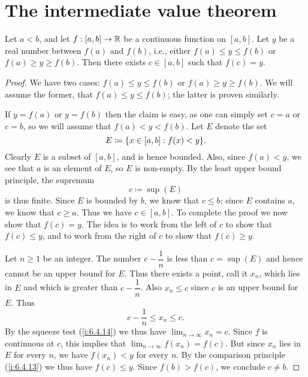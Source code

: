 \section{The intermediate value theorem}\label{i:sec:9.7}

\begin{thm}\label{i:9.7.1}
  Let \(a < b\), and let \(f : [a, b] \to \mathbb{R}\) be a continuous function on \([a, b]\).
  Let \(y\) be a real number between \(f(a)\) and \(f(b)\), i.e., either \(f(a) \leq y \leq f(b)\) or \(f(a) \geq y \geq f(b)\).
  Then there exists \(c \in [a, b]\) such that \(f(c) = y\).
\end{thm}

\begin{proof}
  We have two cases: \(f(a) \leq y \leq f(b)\) or \(f(a) \geq y \geq f(b)\).
  We will assume the former, that \(f(a) \leq y \leq f(b)\);
  the latter is proven similarly.

  If \(y = f(a)\) or \(y = f(b)\) then the claim is easy, as one can simply set \(c = a\) or \(c = b\), so we will assume that \(f(a) < y < f(b)\).
  Let \(E\) denote the set
  \[
    E \coloneqq \set{x \in [a, b] : f(x) < y}.
  \]
  Clearly \(E\) is a subset of \([a, b]\), and is hence bounded.
  Also, since \(f(a) < y\), we see that \(a\) is an element of \(E\), so \(E\) is non-empty.
  By the least upper bound principle, the supremum
  \[
    c \coloneqq \sup(E)
  \]
  is thus finite.
  Since \(E\) is bounded by \(b\), we know that \(c \leq b\);
  since \(E\) contains \(a\), we know that \(c \geq a\).
  Thus we have \(c \in [a, b]\).
  To complete the proof we now show that \(f(c) = y\).
  The idea is to work from the left of \(c\) to show that \(f(c) \leq y\), and to work from the right of \(c\) to show that \(f(c) \geq y\).

  Let \(n \geq 1\) be an integer.
  The number \(c - \dfrac{1}{n}\) is less than \(c = \sup(E)\) and hence cannot be an upper bound for \(E\).
  Thus there exists a point, call it \(x_n\), which lies in \(E\) and which is greater than \(c - \dfrac{1}{n}\).
  Also \(x_n \leq c\) since \(c\) is an upper bound for \(E\).
  Thus
  \[
    c - \dfrac{1}{n} \leq x_n \leq c.
  \]
  By the squeeze test (\cref{i:6.4.14}) we thus have \(\lim_{n \to \infty} x_n = c\).
  Since \(f\) is continuous at \(c\), this implies that \(\lim_{n \to \infty} f(x_n) = f(c)\).
  But since \(x_n\) lies in \(E\) for every \(n\), we have \(f(x_n) < y\) for every \(n\).
  By the comparison principle (\cref{i:6.4.13}) we thus have \(f(c) \leq y\).
  Since \(f(b) > f(c)\), we conclude \(c \neq b\).


\end{proof}
